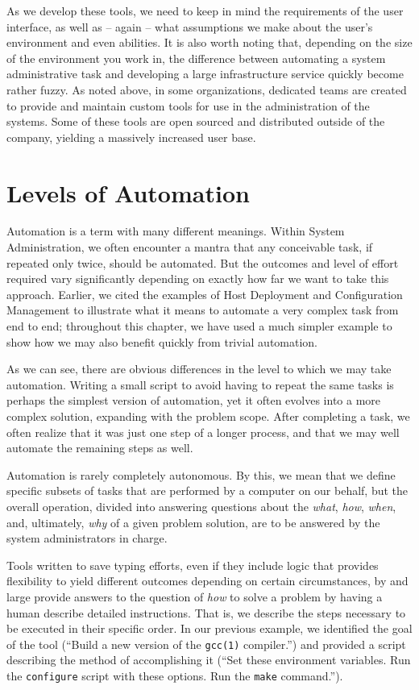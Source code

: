 As we develop these tools, we need to keep in mind the
requirements of the user interface, as well as --
again -- what assumptions we make about the user's
environment and even abilities.  It is also worth
noting that, depending on the size of the environment
you work in, the difference between automating a
system administrative task and developing a large
infrastructure service quickly become rather fuzzy.  As
noted above, in some organizations, dedicated teams
are created to provide and maintain custom tools for
use in the administration of the systems.  Some of
these tools are open sourced and distributed outside
of the company, yielding a massively increased user
base.

\section{Levels of Automation}
\label{automation:levels}

Automation is a term with many different meanings.
Within System Administration, we often encounter a
mantra that any conceivable task, if repeated only
twice, should be automated.  But the outcomes and
level of effort required vary significantly depending
on exactly how far we want to take this approach.
Earlier, we cited the examples of Host Deployment and
Configuration Management to illustrate what it means
to automate a very complex task from end to end;
throughout this chapter, we have used a much simpler
example to show how we may also benefit quickly from
trivial automation.

As we can see, there are obvious differences in the
level to which we may take automation.  Writing a
small script to avoid having to repeat the same tasks
is perhaps the simplest version of automation, yet it
often evolves into a more complex solution, expanding
with the problem scope.  After completing a task, we
often realize that it was just one step of a longer
process, and that we may well automate the remaining
steps as well.

Automation is rarely completely autonomous.  By this,
we mean that we define specific subsets of tasks that
are performed by a computer on our behalf, but the
overall operation, divided into answering questions
about the {\em what}, {\em how}, {\em when}, and,
ultimately, {\em why} of a given problem solution, are
to be answered by the system administrators in charge.

Tools written to save typing efforts, even if they
include logic that provides flexibility to yield
different outcomes depending on certain circumstances,
by and large provide answers to the question of {\em
how} to solve a problem by having a human describe
detailed instructions.  That is, we describe the steps
necessary to be executed in their specific order.  In
our previous example, we identified the goal of the
tool (``Build a new version of the \verb+gcc(1)+
compiler.'') and provided a script describing the
method of accomplishing it (``Set these environment
variables.  Run the \verb+configure+ script with these
options.  Run the \verb+make+ command.'').

